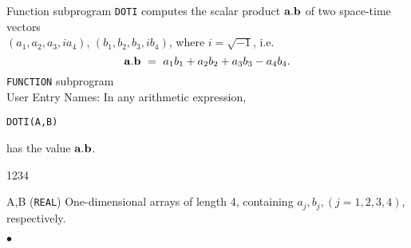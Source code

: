                              
                     
                     
                          
Function subprogram {\tt DOTI} computes the scalar product
${\bf a.b}$ of two space-time vectors \\
$(a_1,a_2,a_3,ia_4)$, $(b_1,b_2,b_3,ib_4)$, where $i=\sqrt{-1}$, i.e.
$${\bf a.b} \ = \ a_1b_1+a_2b_2+a_3b_3-a_4b_4.$$
\Structure
{\tt FUNCTION} subprogram \\
User Entry Names: 
\Usage
In any arithmetic expression,
\begin{center}
{\tt DOTI(A,B)}
\end{center}
has the value ${\bf a.b}$.
\begin{DLtt}{1234}
\item[A,B] ({\tt REAL}) One-dimensional arrays of length 4, containing
$a_j,b_j,(j=1,2,3,4)$, respectively.
\end{DLtt}
$\bullet$
